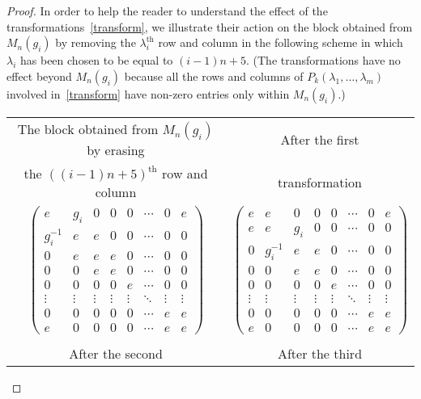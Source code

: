 \documentclass[11pt,reqno]{amsart}
\numberwithin{equation}{section}
\theoremstyle{remark}
\def\la{\lambda}
\begin{document}
\begin{proof}
In order to help the reader to understand the effect of the
transformations~\eqref{transform}, we illustrate their action on
the block obtained from $M_n(g_i)$ by removing the
$\la_i^{\mathrm{th}}$ row and column in the following scheme in
which $\lambda_i$ has been chosen to be equal to $(i-1)n+5$. (The
transformations have no effect beyond $M_n(g_i)$ because all the
rows and columns of $P_k(\la_1,\ldots,\la_m)$ involved
in~\eqref{transform} have non-zero entries only within
$M_n(g_i)$.)

{\small
\begin{center}
\begin{tabular}{cc}
The block obtained from $M_n(g_i)$ by erasing  & After the first\\
the $((i-1)n+5)^{\mathrm{th}}$ row and column  & transformation \\[1ex]
$\begin{pmatrix}
e        & g_i & 0 & 0 &  0 &\cdots & 0 & e \\
g_i^{-1} & e   & e & 0 &  0 &\cdots & 0 & 0 \\
0        & e   & e & e &  0 &\cdots & 0 & 0 \\
0        & 0   & e & e &  0 &\cdots & 0 & 0 \\
0        & 0   & 0 & 0 &  e &\cdots & 0 & 0 \\
\vdots   & \vdots & \vdots & \vdots & \vdots &\ddots & \vdots & \vdots \\
0        & 0   & 0 & 0 &  0 &\cdots & e & e \\
e        & 0   & 0 & 0 &  0 &\cdots & e & e
\end{pmatrix}$
& $\begin{pmatrix}
e        & e   & 0 & 0 &  0 &\cdots & 0 & e \\
e   & e  & g_i & 0 &  0 &\cdots & 0 & 0 \\
0   & g_i^{-1} & e & e &  0 &\cdots & 0 & 0 \\
0        & 0   & e & e &  0 &\cdots & 0 & 0 \\
0        & 0   & 0 & 0 &  e &\cdots & 0 & 0 \\
\vdots   & \vdots & \vdots & \vdots & \vdots &\ddots & \vdots & \vdots \\
0        & 0   & 0 & 0 &  0 &\cdots & e & e \\
e        & 0   & 0 & 0 &  0 &\cdots & e & e
\end{pmatrix}$\\
&\\
After the second & After the third\\

\end{tabular}
\end{center}}
\end{proof}
\end{document}
